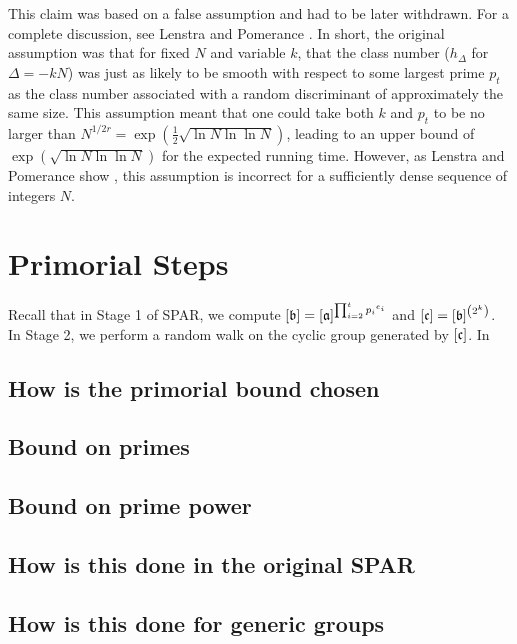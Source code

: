 \documentclass{ucalgthes1}
\theoremstyle{definition}
\begin{document}
This claim was based on a false assumption and had to be later withdrawn.  For a complete discussion, see Lenstra and Pomerance \cite[\S 11]{Lenstra1992}.  In short, the original assumption was that for fixed $N$ and variable $k$, that the class number ($h_\Delta$ for $\Delta = -kN$) was just as likely to be smooth with respect to some largest prime $p_t$ as the class number associated with a random discriminant of approximately the same size.  This assumption meant that one could take both $k$ and $p_t$ to be no larger than $N^{1/2r} = \exp\left(\frac{1}{2}\sqrt{\ln N \ln \ln N}\right)$, leading to an upper bound of $\exp\left(\sqrt{\ln N \ln \ln N}\right)$ for the expected running time.  However, as Lenstra and Pomerance show \cite[\S 11]{Lenstra1992}, this assumption is incorrect for a sufficiently dense sequence of integers $N$.



\bigbreak
\section{Primorial Steps}
\label{sec:primorial}

Recall that in Stage 1 of SPAR, we compute $[\mathfrak b] = [\mathfrak a]^{\prod_{i=2}^t {p_i}^{e_i}}$ and $[\mathfrak c] = [\mathfrak b]^{\left(2^k\right)}$.  In Stage 2, we perform a random walk on the cyclic group generated by $[\mathfrak c]$.  In 

\subsection{How is the primorial bound chosen}

\subsection{Bound on primes}

\subsection{Bound on prime power}

\subsection{How is this done in the original SPAR}

\subsection{How is this done for generic groups}
\end{document}
